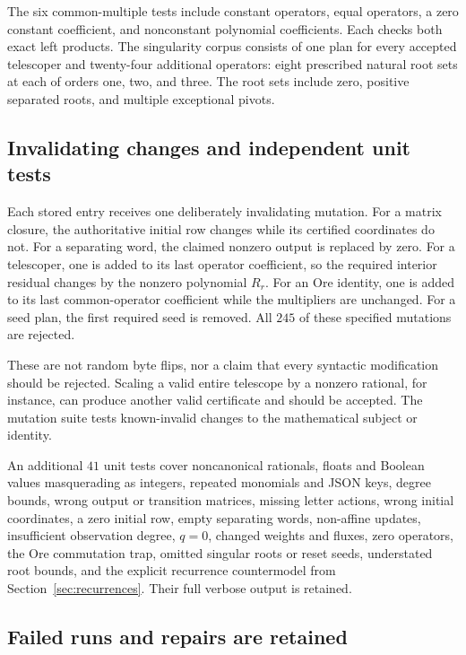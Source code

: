 The six common-multiple tests include constant operators, equal operators, a
zero constant coefficient, and nonconstant polynomial coefficients. Each checks
both exact left products. The singularity corpus consists of one plan for every
accepted telescoper and twenty-four additional operators: eight prescribed
natural root sets at each of orders one, two, and three. The root sets include
zero, positive separated roots, and multiple exceptional pivots.

\subsection{Invalidating changes and independent unit tests}

Each stored entry receives one deliberately invalidating mutation. For a matrix
closure, the authoritative initial row changes while its certified coordinates
do not. For a separating word, the claimed nonzero output is replaced by zero.
For a telescoper, one is added to its last operator coefficient, so the required
interior residual changes by the nonzero polynomial $R_r$. For an Ore identity,
one is added to its last common-operator coefficient while the multipliers are
unchanged. For a seed plan, the first required seed is removed. All $245$ of
these specified mutations are rejected.

These are not random byte flips, nor a claim that every syntactic modification
should be rejected. Scaling a valid entire telescope by a nonzero rational,
for instance, can produce another valid certificate and should be accepted.
The mutation suite tests known-invalid changes to the mathematical subject or
identity.

An additional $41$ unit tests cover noncanonical rationals, floats and Boolean
values masquerading as integers, repeated monomials and JSON keys, degree bounds,
wrong output or transition matrices, missing letter actions, wrong initial
coordinates, a zero initial row, empty separating words, non-affine updates,
insufficient observation degree, $q=0$, changed weights and fluxes, zero
operators, the Ore commutation trap, omitted singular roots or reset seeds,
understated root bounds, and the explicit recurrence countermodel from
Section~\ref{sec:recurrences}. Their full verbose output is retained.

\subsection{Failed runs and repairs are retained}

